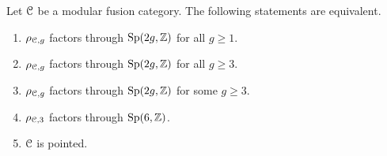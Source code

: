 \documentclass[11pt]{article}
\begin{document}
\begin{thm}\label{thm:triv-torelli-all-genus}
Let ${\mathcal{C}}$ be a modular fusion category.  The following statements are equivalent.
\begin{enumerate}
\item
    $\rho_{{\mathcal{C}}, {g}}$ factors through ${\operatorname{Sp}}(2g, {\mathbb{Z}})$ for all $g \ge 1$.
\item 
    $\rho_{{\mathcal{C}}, {g}}$ factors through ${\operatorname{Sp}}(2g, {\mathbb{Z}})$ for all $g \ge 3$.
\item 
    $\rho_{{\mathcal{C}}, {g}}$ factors through ${\operatorname{Sp}}(2g, {\mathbb{Z}})$ for some $g \ge 3$.
\item
    $\rho_{{\mathcal{C}}, {3}}$ factors through ${\operatorname{Sp}}(6, {\mathbb{Z}})$. 
\item
    $\mathcal{C}$ is pointed.
\end{enumerate} 
\end{thm}
\end{document}
